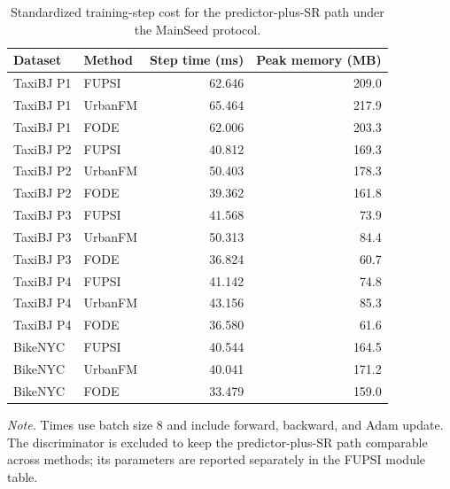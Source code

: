 \begin{table}[t]
\centering
\small
\caption{Standardized training-step cost for the predictor-plus-SR path under the MainSeed protocol.}
\label{tab:sr_pipeline_training_cost}
\begin{tabular}{llrr}
\toprule
Dataset & Method & Step time (ms) & Peak memory (MB) \\
\midrule
TaxiBJ P1 & FUPSI & 62.646 & 209.0 \\
TaxiBJ P1 & UrbanFM & 65.464 & 217.9 \\
TaxiBJ P1 & FODE & 62.006 & 203.3 \\
\addlinespace
TaxiBJ P2 & FUPSI & 40.812 & 169.3 \\
TaxiBJ P2 & UrbanFM & 50.403 & 178.3 \\
TaxiBJ P2 & FODE & 39.362 & 161.8 \\
\addlinespace
TaxiBJ P3 & FUPSI & 41.568 & 73.9 \\
TaxiBJ P3 & UrbanFM & 50.313 & 84.4 \\
TaxiBJ P3 & FODE & 36.824 & 60.7 \\
\addlinespace
TaxiBJ P4 & FUPSI & 41.142 & 74.8 \\
TaxiBJ P4 & UrbanFM & 43.156 & 85.3 \\
TaxiBJ P4 & FODE & 36.580 & 61.6 \\
\addlinespace
BikeNYC & FUPSI & 40.544 & 164.5 \\
BikeNYC & UrbanFM & 40.041 & 171.2 \\
BikeNYC & FODE & 33.479 & 159.0 \\
\bottomrule
\end{tabular}
\begin{minipage}{0.90\linewidth}
\footnotesize \textit{Note.} Times use batch size 8 and include forward, backward, and Adam update. The discriminator is excluded to keep the predictor-plus-SR path comparable across methods; its parameters are reported separately in the FUPSI module table.
\end{minipage}
\end{table}
